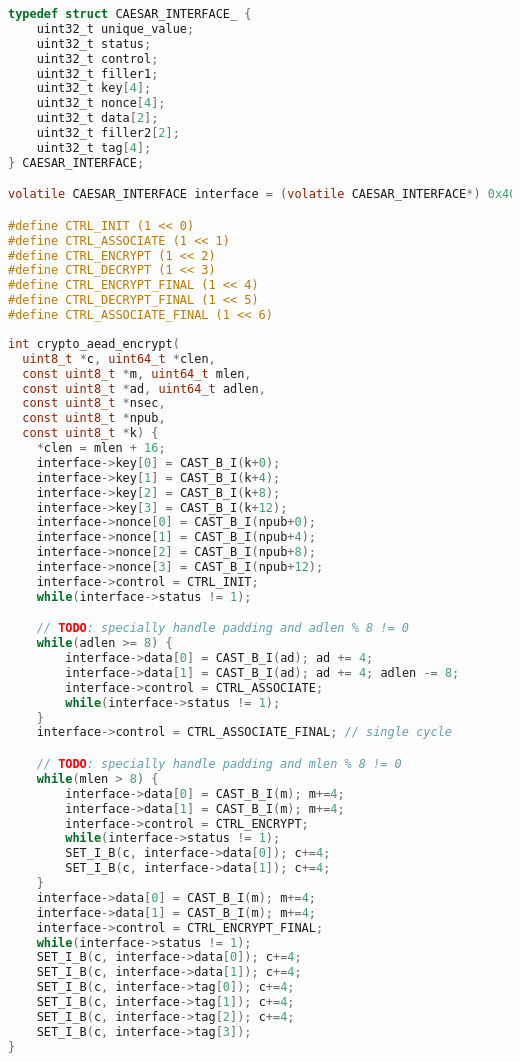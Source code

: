 \documentclass[runningheads]{llncs}
\begin{document}
\begin{lstlisting}[float=htb,language=C,caption={Memory Interface defined in C. Accessible at address 0x40000000.},label=lst:c_struct,basicstyle=\footnotesize\ttfamily]
typedef struct CAESAR_INTERFACE_ {
    uint32_t unique_value;
    uint32_t status;
    uint32_t control;
    uint32_t filler1;
    uint32_t key[4];
    uint32_t nonce[4];
    uint32_t data[2];
    uint32_t filler2[2];
    uint32_t tag[4]; 
} CAESAR_INTERFACE;

volatile CAESAR_INTERFACE interface = (volatile CAESAR_INTERFACE*) 0x40000000;

#define CTRL_INIT (1 << 0)
#define CTRL_ASSOCIATE (1 << 1)
#define CTRL_ENCRYPT (1 << 2)
#define CTRL_DECRYPT (1 << 3)
#define CTRL_ENCRYPT_FINAL (1 << 4)
#define CTRL_DECRYPT_FINAL (1 << 5)
#define CTRL_ASSOCIATE_FINAL (1 << 6)
\end{lstlisting}

\begin{lstlisting}[float=htb,language=c,caption={Simple way of using the hardware to authenticate and encrypt data.},label=lst:c_auth_enc,basicstyle=\footnotesize\ttfamily]
int crypto_aead_encrypt(
  uint8_t *c, uint64_t *clen,
  const uint8_t *m, uint64_t mlen,
  const uint8_t *ad, uint64_t adlen,
  const uint8_t *nsec,
  const uint8_t *npub,
  const uint8_t *k) {
    *clen = mlen + 16;
    interface->key[0] = CAST_B_I(k+0);
    interface->key[1] = CAST_B_I(k+4);
    interface->key[2] = CAST_B_I(k+8);
    interface->key[3] = CAST_B_I(k+12);
    interface->nonce[0] = CAST_B_I(npub+0);
    interface->nonce[1] = CAST_B_I(npub+4);
    interface->nonce[2] = CAST_B_I(npub+8);
    interface->nonce[3] = CAST_B_I(npub+12);
    interface->control = CTRL_INIT;
    while(interface->status != 1);

    // TODO: specially handle padding and adlen % 8 != 0
    while(adlen >= 8) {
        interface->data[0] = CAST_B_I(ad); ad += 4;
        interface->data[1] = CAST_B_I(ad); ad += 4; adlen -= 8;
        interface->control = CTRL_ASSOCIATE;
        while(interface->status != 1);
    }
    interface->control = CTRL_ASSOCIATE_FINAL; // single cycle

    // TODO: specially handle padding and mlen % 8 != 0
    while(mlen > 8) {
        interface->data[0] = CAST_B_I(m); m+=4;
        interface->data[1] = CAST_B_I(m); m+=4;
        interface->control = CTRL_ENCRYPT;
        while(interface->status != 1);
        SET_I_B(c, interface->data[0]); c+=4;
        SET_I_B(c, interface->data[1]); c+=4;
    }
    interface->data[0] = CAST_B_I(m); m+=4;
    interface->data[1] = CAST_B_I(m); m+=4;
    interface->control = CTRL_ENCRYPT_FINAL;
    while(interface->status != 1);
    SET_I_B(c, interface->data[0]); c+=4;
    SET_I_B(c, interface->data[1]); c+=4;
    SET_I_B(c, interface->tag[0]); c+=4;
    SET_I_B(c, interface->tag[1]); c+=4;
    SET_I_B(c, interface->tag[2]); c+=4;
    SET_I_B(c, interface->tag[3]); 
}
\end{lstlisting}
\end{document}
